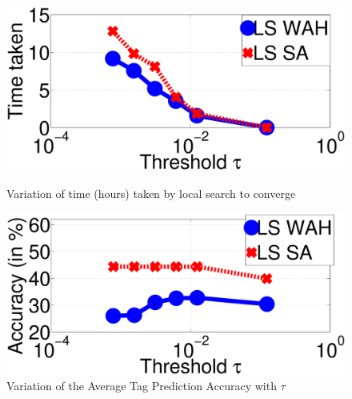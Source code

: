 \begin{figure}[t!]
  \includegraphics[width=\linewidth]{TagTree/TimeNIterationsWithTau}
  \caption{Variation of time (hours) taken by local search to converge}
  \label{fig:TauTimetaken}
\endminipage %
%
  \includegraphics[width=\linewidth]{TagTree/RebuttalAccuracyWithTauNew}
  \caption{Variation of the Average Tag Prediction Accuracy with $\tau$}
  \label{fig:TauAccuracy}
\endminipage
\end{figure}

